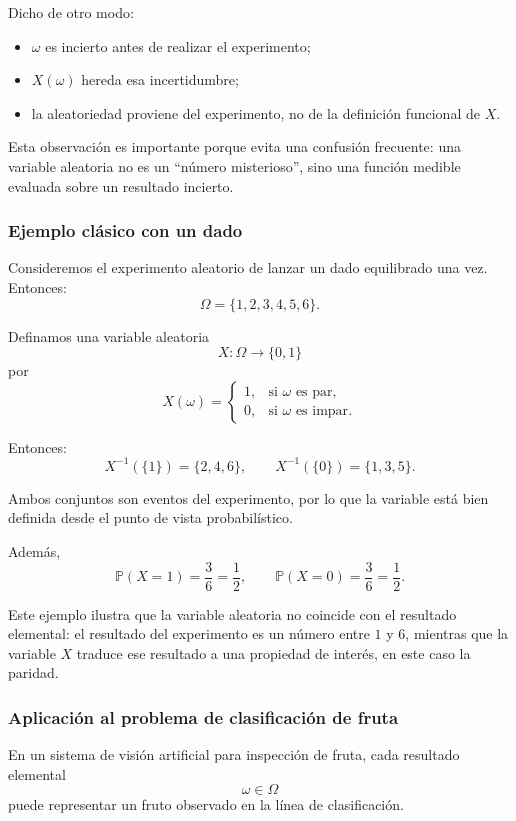 \documentclass{article}
\begin{document}
Dicho de otro modo:

\begin{itemize}
\item \(\omega\) es incierto antes de realizar el experimento;
\item \(X(\omega)\) hereda esa incertidumbre;
\item la aleatoriedad proviene del experimento, no de la definición funcional de \(X\).
\end{itemize}

Esta observación es importante porque evita una confusión frecuente: una variable aleatoria no es un ``número misterioso'', sino una función medible evaluada sobre un resultado incierto.

\subsubsection*{Ejemplo clásico con un dado}

Consideremos el experimento aleatorio de lanzar un dado equilibrado una vez. Entonces:
\[
\Omega=\{1,2,3,4,5,6\}.
\]

Definamos una variable aleatoria
\[
X:\Omega\to\{0,1\}
\]
por
\[
X(\omega)=
\begin{cases}
1, & \text{si } \omega \text{ es par},\\
0, & \text{si } \omega \text{ es impar}.
\end{cases}
\]

Entonces:
\[
X^{-1}(\{1\})=\{2,4,6\},
\qquad
X^{-1}(\{0\})=\{1,3,5\}.
\]

Ambos conjuntos son eventos del experimento, por lo que la variable está bien definida desde el punto de vista probabilístico.

Además,
\[
\mathbb{P}(X=1)=\frac{3}{6}=\frac{1}{2},
\qquad
\mathbb{P}(X=0)=\frac{3}{6}=\frac{1}{2}.
\]

Este ejemplo ilustra que la variable aleatoria no coincide con el resultado elemental: el resultado del experimento es un número entre \(1\) y \(6\), mientras que la variable \(X\) traduce ese resultado a una propiedad de interés, en este caso la paridad.

\subsubsection*{Aplicación al problema de clasificación de fruta}

En un sistema de visión artificial para inspección de fruta, cada resultado elemental
\[
\omega\in\Omega
\]
puede representar un fruto observado en la línea de clasificación.
\end{document}

